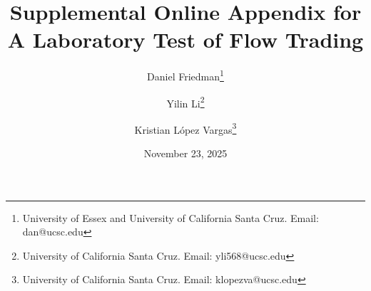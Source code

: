 \documentclass[12pt]{article}
\title{Supplemental Online Appendix for \\
A Laboratory Test of Flow Trading}
\author{
  Daniel Friedman\thanks{
  University of Essex and University of California Santa Cruz. Email: dan@ucsc.edu}
\and
  Yilin Li\thanks{
  University of California Santa Cruz. Email: yli568@ucsc.edu}
\and
  Kristian L\'opez Vargas\thanks{
  University of California Santa Cruz. Email: klopezva@ucsc.edu}}
\date{November 23, 2025}
\begin{document}
\maketitle

\begin{singlespace}
\appendix
\renewcommand\thesubsection{\thesection.\arabic{subsection}}
\setcounter{page}{1}




\end{singlespace}
\end{document}
